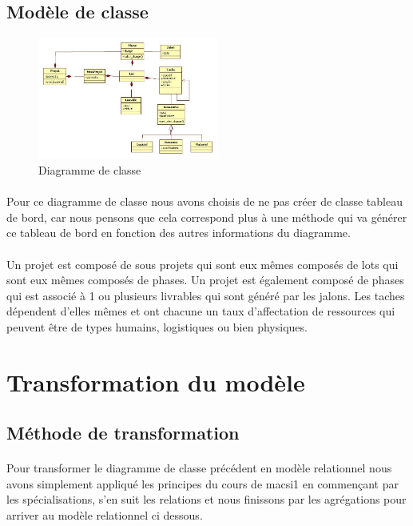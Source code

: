 \documentclass[a4paper, 12pt]{article}
\begin{document}
\subsection{Modèle de classe}

\begin{figure}[h!]
	\includegraphics[height=4cm]{diagramme_de_classe.jpg}
	\caption{Diagramme de classe}
\end{figure}
\paragraph{}Pour ce diagramme de classe nous avons choisis de ne pas créer de classe tableau de bord, car nous pensons que cela correspond plus à une méthode qui va générer ce tableau de bord en fonction des autres informations du diagramme.
\paragraph{}Un projet est composé de sous projets qui sont eux mêmes composés de lots qui sont eux mêmes composés de phases. Un projet est également composé de phases qui est associé à 1 ou plusieurs livrables qui sont généré par les jalons. Les taches dépendent d'elles mêmes et ont chacune un taux d'affectation de ressources qui peuvent être de types humains, logistiques ou bien physiques.

\newpage

\section{Transformation du modèle}
\subsection{Méthode de transformation}
\paragraph{}Pour transformer le diagramme de classe précédent en modèle relationnel nous avons simplement appliqué les principes du cours de macsi1 en commençant par les spécialisations, s'en suit les relations et nous finissons par les agrégations pour arriver au modèle relationnel ci dessous.
\end{document}
